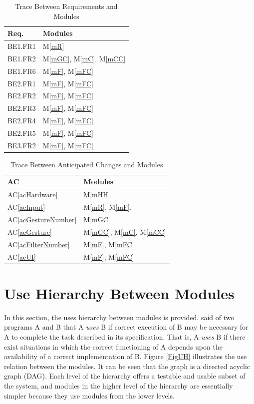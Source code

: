 \documentclass[12pt, titlepage]{article}
\newcommand{\acref}[1]{AC\ref{#1}}
\newcommand{\mref}[1]{M\ref{#1}}
\begin{document}
\begin{table}[H]
\centering
\begin{tabular}{p{} p{}}
\toprule
\textbf{Req.} & \textbf{Modules}\\
\midrule
BE1.FR1 & \mref{mR}\\
BE1.FR2 & \mref{mGC}, \mref{mC}, \mref{mCC}\\
BE1.FR6 & \mref{mF}, \mref{mFC}\\
BE2.FR1 & \mref{mF}, \mref{mFC}\\
BE2.FR2 & \mref{mF}, \mref{mFC}\\
BE2.FR3 & \mref{mF}, \mref{mFC}\\
BE2.FR4 & \mref{mF}, \mref{mFC}\\
BE2.FR5 & \mref{mF}, \mref{mFC}\\
BE3.FR2 & \mref{mF}, \mref{mFC}\\
\bottomrule
\end{tabular}
\caption{Trace Between Requirements and Modules}
\label{TblRT}
\end{table}

\begin{table}[H]
\centering
\begin{tabular}{p{} p{}}
\toprule
\textbf{AC} & \textbf{Modules}\\
\midrule
\acref{acHardware} & \mref{mHH}\\
\acref{acInput} & \mref{mR}, \mref{mF}, \\
\acref{acGestureNumber} & \mref{mGC}\\
\acref{acGesture} & \mref{mGC}, \mref{mC}, \mref{mCC}\\
\acref{acFilterNumber} & \mref{mF}, \mref{mFC}\\
\acref{acUI} & \mref{mF}, \mref{mFC} \\
\bottomrule
\end{tabular}
\caption{Trace Between Anticipated Changes and Modules}
\label{TblACT}
\end{table}

\section{Use Hierarchy Between Modules} \label{SecUse}

In this section, the uses hierarchy between modules is
provided. \citet{Parnas1978} said of two programs A and B that A {\em uses} B if
correct execution of B may be necessary for A to complete the task described in
its specification. That is, A {\em uses} B if there exist situations in which
the correct functioning of A depends upon the availability of a correct
implementation of B.  Figure \ref{FigUH} illustrates the use relation between
the modules. It can be seen that the graph is a directed acyclic graph
(DAG). Each level of the hierarchy offers a testable and usable subset of the
system, and modules in the higher level of the hierarchy are essentially simpler
because they use modules from the lower levels.
\end{document}
